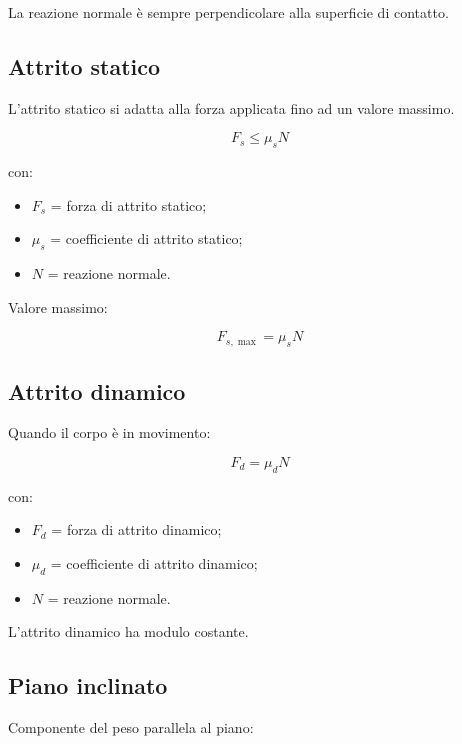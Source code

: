 \noindent La reazione normale è sempre perpendicolare alla superficie di contatto.

\vspace{0.3cm}

\subsection{Attrito statico}

\noindent L'attrito statico si adatta alla forza applicata fino ad un valore massimo.

\[
\boxed{F_s\le\mu_sN}
\]

\noindent con:

\begin{itemize}
    \item $F_s$ = forza di attrito statico;
    \item $\mu_s$ = coefficiente di attrito statico;
    \item $N$ = reazione normale.
\end{itemize}

\noindent Valore massimo:

\[
\boxed{F_{s,\max}=\mu_sN}
\]

\vspace{0.3cm}

\subsection{Attrito dinamico}

\noindent Quando il corpo è in movimento:

\[
\boxed{F_d=\mu_dN}
\]

\noindent con:

\begin{itemize}
    \item $F_d$ = forza di attrito dinamico;
    \item $\mu_d$ = coefficiente di attrito dinamico;
    \item $N$ = reazione normale.
\end{itemize}

\noindent L'attrito dinamico ha modulo costante.

\vspace{0.3cm}

\subsection{Piano inclinato}

\noindent Componente del peso parallela al piano:

